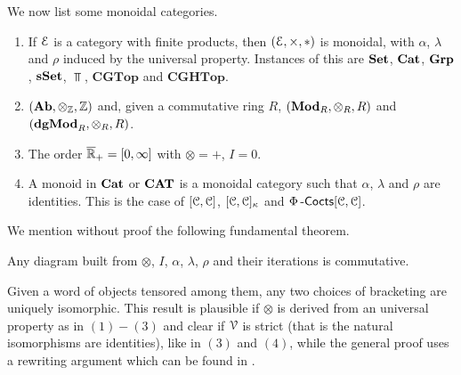 \documentclass[a4paper,11pt,oneside,openany]{scrbook}
\begin{document}
\begin{exmp}
	We now list some monoidal categories.
	\begin{enumerate}
		\item If $\operatorname{\mathcal{E}}$ is a category with finite products, then $(\operatorname{\mathcal{E}},\times,*)$ is monoidal, with $\alpha$, $\lambda$ and $\rho$ induced by the universal property. Instances of this are ${\normalfont\textbf{Set}}$, ${\normalfont\textbf{Cat}}$, ${\normalfont\textbf{Grp}}$, ${\normalfont\textbf{sSet}}$, $\Top$, $\mathbf{CGTop}$ and $\mathbf{CGHTop}$.
		\item $({\normalfont\textbf{Ab}},\otimes_{\operatorname{\mathbb{Z}}},\operatorname{\mathbb{Z}})$ and, given a commutative ring $R$, $({\normalfont\textbf{Mod}}_R,\otimes_R,R)$ and $({\normalfont\textbf{dgMod}}_R,\otimes_R,R)$.
		\item The order $\overline{\operatorname{\mathbb{R}}}_+=[0,\infty]$ with $\otimes=+$, $I=0$.
		\item A monoid in ${\normalfont\textbf{Cat}}$ or ${\normalfont\textbf{CAT}}$ is a monoidal category such that
            $\alpha$, $\lambda$ and $\rho$ are identities. This is the case of
            $[\operatorname{\mathcal{C}},\operatorname{\mathcal{C}}]$, $[\operatorname{\mathcal{C}},\operatorname{\mathcal{C}}]_\kappa$ and $\Phi\operatorname{-\mathsf{Cocts}}[\operatorname{\mathcal{C}},\operatorname{\mathcal{C}}]$.
	\end{enumerate}
\end{exmp}

We mention without proof the following fundamental theorem.

\begin{thm}
	Any diagram built from $\otimes$, $I$, $\alpha$, $\lambda$, $\rho$ and their iterations is commutative.
\end{thm}

Given a word of objects tensored among them, any two choices of bracketing are
uniquely isomorphic. This result is plausible if $\otimes$ is derived from an
universal property as in $(1)-(3)$ and clear if $\operatorname{\mathcal{V}}$ is strict (that is the
natural isomorphisms are identities), like in $(3)$ and $(4)$, while the general
proof uses a rewriting argument which can be found in \cite{MacLane2}.
\end{document}
